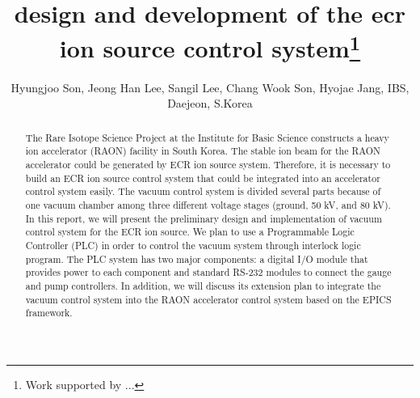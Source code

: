 \documentclass[a4paper,
              ]{jacow}
\begin{document}
\title{design and development of the ecr ion source control system\thanks{Work supported by ...}}

\author{ Hyungjoo Son, Jeong Han Lee, Sangil Lee, Chang Wook Son, Hyojae Jang, IBS, Daejeon, S.Korea\\}

\maketitle

%
\begin{abstract}
The Rare Isotope Science Project at the Institute for Basic Science constructs a heavy ion accelerator (RAON) facility in South Korea. The stable ion beam for the RAON accelerator could be generated by ECR ion source system. Therefore, it is necessary to build an ECR ion source control system that could be integrated into an accelerator control system easily. The vacuum control system is divided several parts because of one vacuum chamber among three different voltage stages (ground, 50 kV, and 80 kV).
In this report, we will present the preliminary design and implementation of vacuum control system for the ECR ion source. We plan to use a Programmable Logic Controller (PLC) in order to control the vacuum system through interlock logic program. The PLC system has two major components: a digital I/O module that provides power to each component and standard RS-232 modules to connect the gauge and pump controllers. In addition, we will discuss its extension plan to integrate the vacuum control system into the RAON accelerator control system based on the EPICS framework.
  
\end{abstract}
\end{document}
